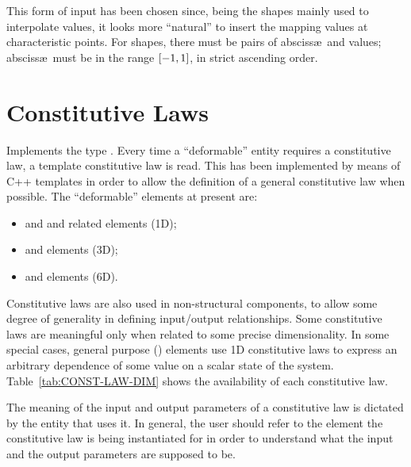 This form of input has been chosen since, being the shapes mainly used to
interpolate values, it looks more ``natural'' to insert the mapping values
at characteristic points.
For  shapes, there must be 
 pairs of absciss\ae\ and values; absciss\ae\
must be in the range $\left[ -1,1 \right]$, in strict ascending order.


\section{Constitutive Laws}\label{sec:ConstitutiveLaw}
Implements the type \texttt{}.
Every time a ``deformable'' entity requires a constitutive law, a template
constitutive law is read. This has been implemented by means of C++
templates in order to allow the definition of a general constitutive law
when possible.
The ``deformable'' elements at present are:
\begin{itemize}
\item {}
	and
	and related elements (1D);
\item {}
	and 
	elements (3D);
\item {}
	and \htmlref{\kw{beam}}{sec:EL:BEAM}
	elements (6D).
\end{itemize}

Constitutive laws are also used in non-structural components,
to allow some degree of generality in defining input/output relationships.
Some constitutive laws are meaningful only when related to some precise
dimensionality. 
In some special cases, general purpose ()
elements use 1D constitutive laws to express an arbitrary dependence
of some value on a scalar state of the system.
Table~\ref{tab:CONST-LAW-DIM} shows the availability of each constitutive law.

The meaning of the input and output parameters of a constitutive law
is dictated by the entity that uses it.
In general, the user should refer to the element the constitutive law
is being instantiated for in order to understand what the input
and the output parameters are supposed to be.

